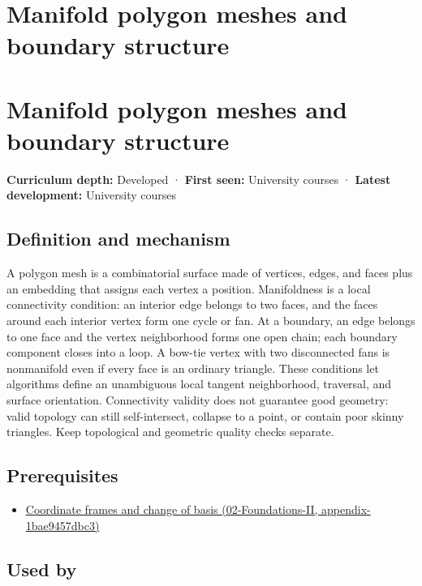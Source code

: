 \hypertarget{appendix-fab348609369}{}
\section*{Manifold polygon meshes and boundary structure}
\section{Manifold polygon meshes and boundary structure}\label{manifold-polygon-meshes-and-boundary-structure}

\textbf{Curriculum depth:} Developed · \textbf{First seen:} University courses · \textbf{Latest development:} University courses

\subsection{Definition and mechanism}\label{definition-and-mechanism}

A polygon mesh is a combinatorial surface made of vertices, edges, and faces plus an embedding that assigns each vertex a position. Manifoldness is a local connectivity condition: an interior edge belongs to two faces, and the faces around each interior vertex form one cycle or fan. At a boundary, an edge belongs to one face and the vertex neighborhood forms one open chain; each boundary component closes into a loop. A bow-tie vertex with two disconnected fans is nonmanifold even if every face is an ordinary triangle. These conditions let algorithms define an unambiguous local tangent neighborhood, traversal, and surface orientation. Connectivity validity does not guarantee good geometry: valid topology can still self-intersect, collapse to a point, or contain poor skinny triangles. Keep topological and geometric quality checks separate.

\subsection{Prerequisites}\label{prerequisites}

\begin{itemize}
\tightlist
\item
  \href{}{Coordinate frames and change of basis (02-Foundations-II, appendix-1bae9457dbc3)}
\end{itemize}

\subsection{Used by}\label{used-by}

